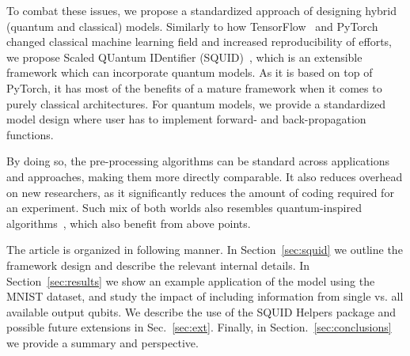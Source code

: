 To combat these issues, we propose a standardized approach of designing hybrid (quantum and classical) models.
Similarly to how TensorFlow~\cite{tensorflow2015-whitepaper} and PyTorch~\cite{PyTorch} changed classical machine learning field and increased reproducibility of efforts, we propose Scaled QUantum IDentifier (SQUID)~\cite{squid}, which is an extensible framework which can incorporate quantum models.
As it is based on top of PyTorch, it has most of the benefits of a mature framework when it comes to purely classical architectures.
For quantum models, we provide a standardized model design where user has to implement forward- and back-propagation functions.

By doing so, the pre-processing algorithms can be standard across applications and approaches, making them more directly comparable.
It also reduces overhead on new researchers, as it significantly reduces the amount of coding required for an experiment.
Such mix of both worlds also resembles quantum-inspired algorithms~\cite{Dunjko2020}, which also benefit from above points.

The article is organized in following manner.
In Section~\ref{sec:squid} we outline the framework design and describe the relevant internal details.
In Section~\ref{sec:results} we show an example application of the model using the MNIST dataset, and study the impact of including information from single vs. all available output qubits. We describe the use of the SQUID Helpers package and possible future extensions in Sec.~\ref{sec:ext}. Finally, in Section.~\ref{sec:conclusions} we provide a summary and perspective.
